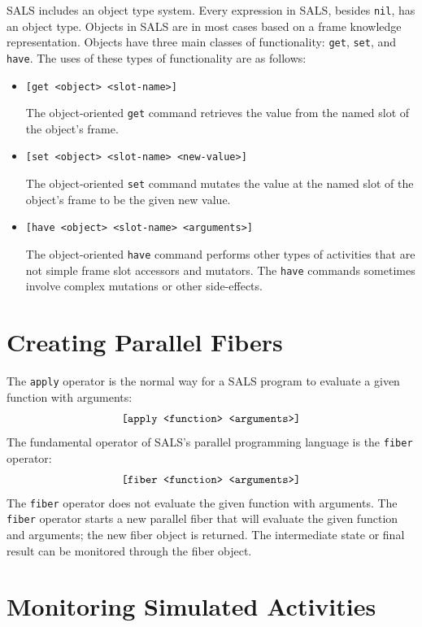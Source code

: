 SALS includes an object type system.  Every expression in SALS,
besides {\tt nil}, has an object type.  Objects in SALS are in most
cases based on a frame knowledge representation.  Objects have three
main classes of functionality: {\tt get}, {\tt set}, and {\tt have}.
The uses of these types of functionality are as follows:
\begin{itemize}
\item {\tt [get <object> <slot-name>]}

The object-oriented {\tt get} command retrieves the value from the
named slot of the object's frame.
\item {\tt [set <object> <slot-name> <new-value>]}

The object-oriented {\tt set} command mutates the value at the named
slot of the object's frame to be the given new value.
\item {\tt [have <object> <slot-name> <arguments>]}

The object-oriented {\tt have} command performs other types of
activities that are not simple frame slot accessors and mutators.  The
{\tt have} commands sometimes involve complex mutations or other
side-effects.
\end{itemize}




\section{Creating Parallel Fibers}

The {\tt apply} operator is the normal way for a SALS program to
evaluate a given function with arguments:
\begin{equation*}
\text{\tt [apply <function> <arguments>]}
\end{equation*}
The fundamental operator of SALS's parallel programming language is
the {\tt fiber} operator:
\begin{equation*}
\text{\tt [fiber <function> <arguments>]}
\end{equation*}
The {\tt fiber} operator does not evaluate the given function with
arguments.  The {\tt fiber} operator starts a new parallel fiber that
will evaluate the given function and arguments; the new fiber object
is returned.  The intermediate state or final result can be monitored
through the fiber object.

\section{Monitoring Simulated Activities}

